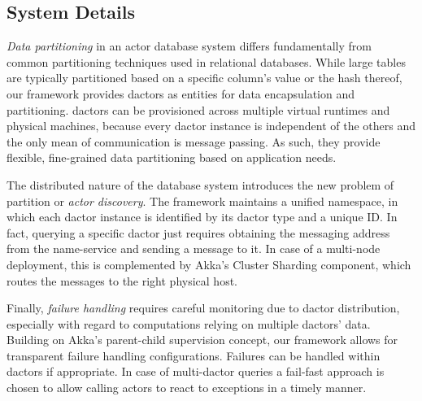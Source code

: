     \subsection{System Details}\label{subsec:framework_discussion}
      \emph{Data partitioning} in an actor database system differs fundamentally from common partitioning techniques used in relational databases.
      While large tables are typically partitioned based on a specific column's value or the hash thereof, our framework provides \glspl{dactor} as entities for data encapsulation and partitioning.
      \Glspl{dactor} can be provisioned across multiple virtual runtimes and physical machines, because every \gls{dactor} instance is independent of the others and the only mean of communication is message passing.
      As such, they provide flexible, fine-grained data partitioning based on application needs.
      
      The distributed nature of the database system introduces the new problem of partition or \emph{actor discovery}.
      The framework maintains a unified namespace, in which each \gls{dactor} instance is identified by its \gls{dactor} type and a unique ID.
      In fact, querying a specific \gls{dactor} just requires obtaining the messaging address from the name-service and sending a message to it.
      In case of a multi-node deployment, this is complemented by Akka's Cluster Sharding component, which routes the messages to the right physical host.
      
      Finally, \emph{failure handling} requires careful monitoring due to \gls{dactor} distribution, especially with regard to computations relying on multiple \glspl{dactor}' data.
      Building on Akka's parent-child supervision concept, our framework allows for transparent failure handling configurations.
      Failures can be handled within \glspl{dactor} if appropriate.
      In case of multi-\gls{dactor} queries a fail-fast approach is chosen to allow calling actors to react to exceptions in a timely manner.